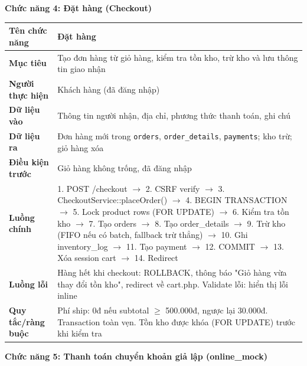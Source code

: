\documentclass[a4paper]{article}
\begin{document}
\vspace{0.5cm}
\noindent\textbf{Chức năng 4: Đặt hàng (Checkout)}

\begin{longtable}{|p{3.5cm}|p{10.5cm}|}
\hline
\textbf{Tên chức năng} & Đặt hàng \\
\hline
\textbf{Mục tiêu} & Tạo đơn hàng từ giỏ hàng, kiểm tra tồn kho, trừ kho và lưu thông tin giao nhận \\
\hline
\textbf{Người thực hiện} & Khách hàng (đã đăng nhập) \\
\hline
\textbf{Dữ liệu vào} & Thông tin người nhận, địa chỉ, phương thức thanh toán, ghi chú \\
\hline
\textbf{Dữ liệu ra} & Đơn hàng mới trong \texttt{orders}, \texttt{order\_details}, \texttt{payments}; kho trừ; giỏ hàng xóa \\
\hline
\textbf{Điều kiện trước} & Giỏ hàng không trống, đã đăng nhập \\
\hline
\textbf{Luồng chính} & 1. POST /checkout $\to$ 2. CSRF verify $\to$ 3. CheckoutService::placeOrder() $\to$ 4. BEGIN TRANSACTION $\to$ 5. Lock product rows (FOR UPDATE) $\to$ 6. Kiểm tra tồn kho $\to$ 7. Tạo orders $\to$ 8. Tạo order\_details $\to$ 9. Trừ kho (FIFO nếu có batch, fallback trừ thẳng) $\to$ 10. Ghi inventory\_log $\to$ 11. Tạo payment $\to$ 12. COMMIT $\to$ 13. Xóa session cart $\to$ 14. Redirect \\
\hline
\textbf{Luồng lỗi} & Hàng hết khi checkout: ROLLBACK, thông báo "Giỏ hàng vừa thay đổi tồn kho", redirect về cart.php. Validate lỗi: hiển thị lỗi inline \\
\hline
\textbf{Quy tắc/ràng buộc} & Phí ship: 0đ nếu subtotal $\geq$ 500.000đ, ngược lại 30.000đ. Transaction toàn vẹn. Tồn kho được khóa (FOR UPDATE) trước khi kiểm tra \\
\hline
\end{longtable}

\vspace{0.5cm}
\noindent\textbf{Chức năng 5: Thanh toán chuyển khoản giả lập (online\_mock)}
\end{document}
